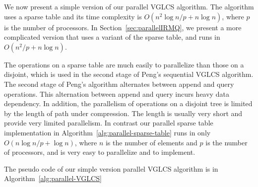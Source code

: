 We now present a simple version of our parallel VGLCS algorithm.  The
algorithm uses a sparse table and its time complexity is $O(n^2 \log n
/ p + n \log n)$, where $p$ is the number of processors.  In
Section~\ref{sec:parallelIRMQ}, we present a more complicated version
that uses a variant of the sparse table, and runs in $O(n^2 / p + n
\log n)$.

The operations on a sparse table are much easily to parallelize than
those on a disjoint, which is used in the second stage of Peng's
sequential VGLCS algorithm.  The second stage of Peng's algorithm
alternates between append and query operations.  This alternation
between append and query incurs heavy data dependency.  In addition,
the parallelism of operations on a disjoint tree is limited by the
length of path under compression.  The length is usually very short
and provide very limited parallelism.  In contrast our parallel sparse
table implementation in Algorithm~\ref{alg:parallel-sparse-table} runs
in only $O(n \log n / p + \log n)$, where $n$ is the number of
elements and $p$ is the number of processors, and is very easy to
parallelize and to implement.



The pseudo code of our simple version parallel VGLCS algorithm is in
Algorithm~\ref{alg:parallel-VGLCS}


